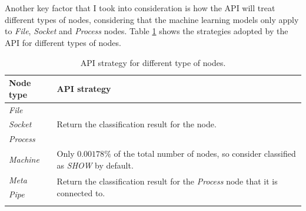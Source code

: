 	\\ \\
	Another key factor that I took into consideration is how the API will treat different types of nodes, considering that the machine learning models only apply to \textit{File}, \textit{Socket} and \textit{Process} nodes. Table \ref{Table: impl/REST/API-strategy} shows the strategies adopted by the API for different types of nodes.
	\begin{longtable}{|p{}|p{}|}
		\textbf{Node type} & \textbf{API strategy} \\
		\hline
		\textit{File} & \multirow{3}{*}{Return the classification result for the node.} \\
		\textit{Socket} & \\
		\textit{Process} & \\
		\hline
		\textit{Machine} & Only $0.00178\%$ of the total number of nodes, so consider classified as \textit{SHOW} by default. \\
		\hline
		\textit{Meta} & \multirow{2}{*}{Return the classification result for the \textit{Process} node that it is connected to.} \\
		\textit{Pipe} & \\
		\hline
		\caption{API strategy for different type of nodes.}
		\label{Table: impl/REST/API-strategy}
 	\end{longtable}
 
